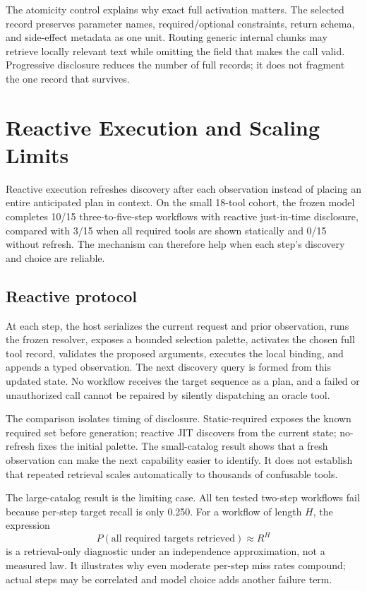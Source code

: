 \documentclass[11pt]{article}
\begin{document}
The atomicity control explains why exact full activation matters. The selected
record preserves parameter names, required/optional constraints, return
schema, and side-effect metadata as one unit. Routing generic internal chunks
may retrieve locally relevant text while omitting the field that makes the
call valid. Progressive disclosure reduces the number of full records; it does
not fragment the one record that survives.

\section{Reactive Execution and Scaling Limits}

Reactive execution refreshes discovery after each observation instead of
placing an entire anticipated plan in context. On the small 18-tool cohort, the
frozen model completes 10/15 three-to-five-step workflows with reactive
just-in-time disclosure, compared with 3/15 when all required tools are shown
statically and 0/15 without refresh. The mechanism can therefore help when each
step's discovery and choice are reliable.

\subsection{Reactive protocol}

At each step, the host serializes the current request and prior observation,
runs the frozen resolver, exposes a bounded selection palette, activates the
chosen full tool record, validates the proposed arguments, executes the local
binding, and appends a typed observation. The next discovery query is formed
from this updated state. No workflow receives the target sequence as a plan,
and a failed or unauthorized call cannot be repaired by silently dispatching an
oracle tool.

The comparison isolates timing of disclosure. Static-required exposes the
known required set before generation; reactive JIT discovers from the current
state; no-refresh fixes the initial palette. The small-catalog result shows
that a fresh observation can make the next capability easier to identify. It
does not establish that repeated retrieval scales automatically to thousands
of confusable tools.

The large-catalog result is the limiting case. All ten tested two-step
workflows fail because per-step target recall is only 0.250. For a workflow of
length $H$, the expression
\[
P(\text{all required targets retrieved})\approx R^H
\]
is a retrieval-only diagnostic under an independence approximation, not a
measured law. It illustrates why even moderate per-step miss rates compound;
actual steps may be correlated and model choice adds another failure term.
\end{document}
